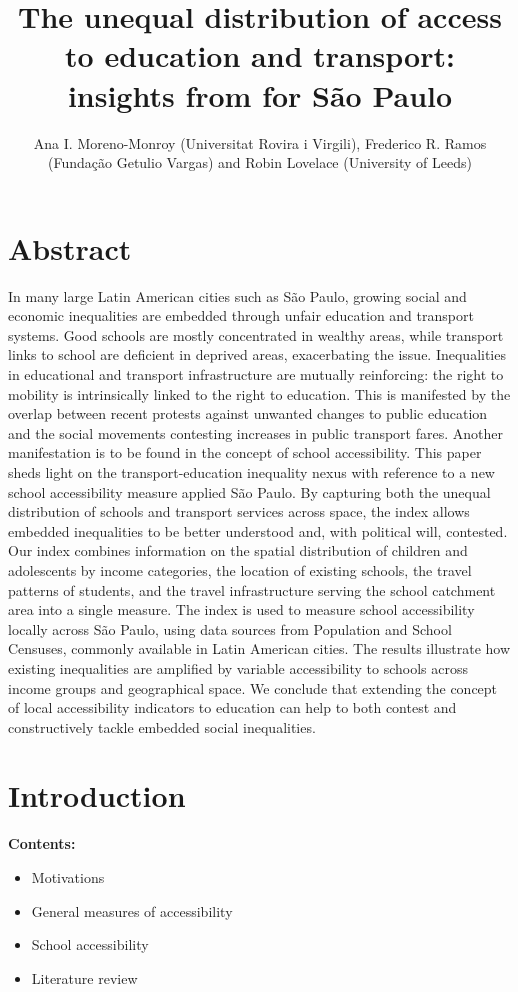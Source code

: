 \documentclass[]{article}
\title{The unequal distribution of access to education and transport: insights
from for São Paulo}
\author{Ana I. Moreno-Monroy (Universitat Rovira i Virgili), Frederico R. Ramos
(Fundação Getulio Vargas) and Robin Lovelace (University of Leeds)}
\date{}
\providecommand{\tightlist}{%
  \setlength{\itemsep}{0pt}\setlength{\parskip}{0pt}}
\begin{document}
\maketitle

\section{Abstract}\label{abstract}

In many large Latin American cities such as São Paulo, growing social
and economic inequalities are embedded through unfair education and
transport systems. Good schools are mostly concentrated in wealthy
areas, while transport links to school are deficient in deprived areas,
exacerbating the issue. Inequalities in educational and transport
infrastructure are mutually reinforcing: the right to mobility is
intrinsically linked to the right to education. This is manifested by
the overlap between recent protests against unwanted changes to public
education and the social movements contesting increases in public
transport fares. Another manifestation is to be found in the concept of
school accessibility. This paper sheds light on the transport-education
inequality nexus with reference to a new school accessibility measure
applied São Paulo. By capturing both the unequal distribution of schools
and transport services across space, the index allows embedded
inequalities to be better understood and, with political will,
contested. Our index combines information on the spatial distribution of
children and adolescents by income categories, the location of existing
schools, the travel patterns of students, and the travel infrastructure
serving the school catchment area into a single measure. The index is
used to measure school accessibility locally across São Paulo, using
data sources from Population and School Censuses, commonly available in
Latin American cities. The results illustrate how existing inequalities
are amplified by variable accessibility to schools across income groups
and geographical space. We conclude that extending the concept of local
accessibility indicators to education can help to both contest and
constructively tackle embedded social inequalities.

\section{Introduction}\label{introduction}

\textbf{Contents:}

\begin{itemize}
\tightlist
\item
  Motivations
\item
  General measures of accessibility
\item
  School accessibility
\item
  Literature review
\end{itemize}
\end{document}
